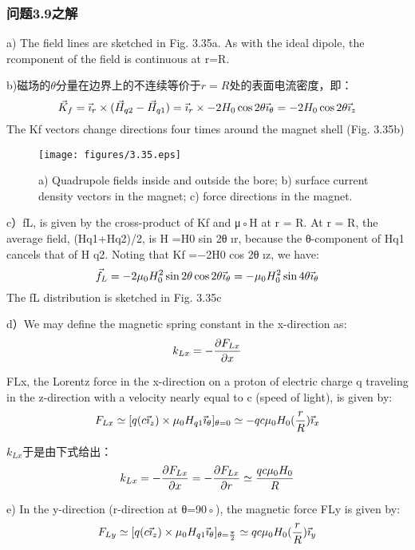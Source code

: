 \subsubsection{问题3.9之解}
a) The field lines are sketched in Fig. 3.35a. As with the ideal dipole, the rcomponent of the field is continuous at r=R.

b)磁场的$\theta$分量在边界上的不连续等价于$r=R$处的表面电流密度，即：
$$\vec{K}_{f}=\vec{\imath}_{r}\times(\vec{H}_{q2}-\vec{H}_{q1})=\vec{\imath}_{r}\times-2H_{0}\cos2\theta\vec{\imath}_{\theta}\\
=-2H_{0}\cos2\theta\vec{\imath}_{z}\\%
$$
The Kf vectors change directions four times around the magnet shell (Fig. 3.35b)
\begin{figure}[htbp]
	\centering
	\texttt{[image: figures/3.35.eps]}
	\caption{a) Quadrupole fields inside and outside the bore; b) surface current
		density vectors in the magnet; c) force directions in the magnet.}
\end{figure}

c）fL, is given by the cross-product of Kf and μ◦H at r = R. At r = R, the
average field, (Hq1+Hq2)/2, is H =H0 sin 2θ	ır, because the θ-component of Hq1
cancels that of H
q2. Noting that Kf =−2H0 cos 2θ	ız, we have:
$$
\vec{f}_{L}=-2\mu_{0}H_{0}^{2}\sin2\theta \cos2\theta\vec{\imath}_{\theta}\\
=-\mu_{0}H_{0}^{2}\sin4\theta\vec{\imath}_{\theta}\\%
$$
The fL distribution is sketched in Fig. 3.35c

d）We may define the magnetic spring constant in the x-direction as:
$$
k_{Lx}=-\frac{\partial F_{Lx}}{\partial x}\\%
$$

FLx, the Lorentz force in the x-direction on a proton of electric charge q traveling
in the z-direction with a velocity nearly equal to c (speed of light), is given by:
$$
F_{Lx}\simeq[q(c\vec{\imath}_{z})\times\mu_{0}H_{q1}\vec{\imath}_{\theta}]_{\theta=0}\\
\simeq-qc\mu_{0}H_{0}(\frac{r}{R})\vec{\imath}_{x}\\%
$$

$k_{Lx}$于是由下式给出：
$$k_{Lx}=-\frac{\partial F_{Lx}}{\partial x}=-\frac{\partial F_{Lx}}{\partial r}\\
\simeq \frac{qc\mu_{0}H_{0}}{R}\\%
$$

e) In the y-direction (r-direction at θ=90◦), the magnetic force FLy is given by:
$$
F_{Ly}\simeq[q(c\vec{\imath}_{z})\times\mu_{0}H_{q1}\vec{\imath}_{\theta}]_{\theta=\frac{\pi}{2}}\\
\simeq qc\mu_{0}H_{0}(\frac{r}{R})\vec{\imath}_{y}\\%
$$

